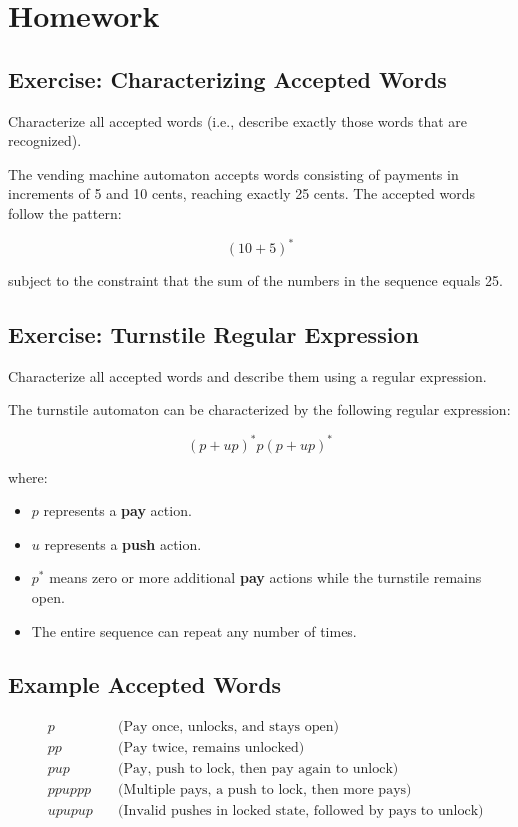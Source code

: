 \documentclass{article}
\begin{document}
\section{Homework}

\subsection{Exercise: Characterizing Accepted Words}

Characterize all accepted words (i.e., describe exactly those words that are recognized).

The vending machine automaton accepts words consisting of payments in increments of 5 and 10 cents, reaching exactly 25 cents. The accepted words follow the pattern:

\[
(10 + 5)^* 
\]

subject to the constraint that the sum of the numbers in the sequence equals 25. 

\subsection{Exercise: Turnstile Regular Expression}

Characterize all accepted words and describe them using a regular expression.

The turnstile automaton can be characterized by the following regular expression:

\[
(p + u p)^* p (p + u p)^*
\]

where:
\begin{itemize}
    \item \( p \) represents a \textbf{pay} action.
    \item \( u \) represents a \textbf{push} action.
    \item \( p^* \) means zero or more additional \textbf{pay} actions while the turnstile remains open.
    \item The entire sequence can repeat any number of times.
\end{itemize}

\subsection*{Example Accepted Words}
\begin{align*}
    & p &\quad \text{(Pay once, unlocks, and stays open)} \\
    & p p &\quad \text{(Pay twice, remains unlocked)} \\
    & p u p &\quad \text{(Pay, push to lock, then pay again to unlock)} \\
    & p p u p p p &\quad \text{(Multiple pays, a push to lock, then more pays)} \\
    & u p u p u p &\quad \text{(Invalid pushes in locked state, followed by pays to unlock)}
\end{align*}
\end{document}
